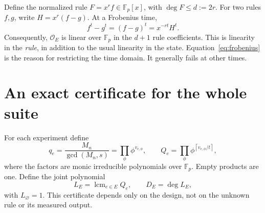 \documentclass{ijuc}
\newcommand{\Fp}{\mathbb F_p}
\newcommand{\Obs}{\mathcal O}
\newcommand{\lcmop}{\operatorname{lcm}}
\newcommand{\ceil}[1]{\left\lceil #1\right\rceil}
\begin{document}
Define the normalized rule $F=x^rf\in\Fp[x]$, with $\deg F\leq d:=2r$. For two rules $f,g$, write $H=x^r(f-g)$. At a Frobenius time,
\begin{equation}
 f^t-g^t=(f-g)^t=x^{-rt}H^t.
 \label{eq:frobenius}
\end{equation}
Consequently, $\Obs_E$ is linear over $\Fp$ in the $d+1$ rule coefficients. This is linearity in the \emph{rule}, in addition to the usual linearity in the state. Equation~\eqref{eq:frobenius} is the reason for restricting the time domain. It generally fails at other times.

\section{An exact certificate for the whole suite}
For each experiment define
\begin{equation}
 q_e=\frac{M_n}{\gcd(M_n,s)}=\prod_{\phi}\phi^{v_{e,\phi}},
 \qquad
 Q_e=\prod_{\phi}\phi^{\ceil{v_{e,\phi}/t}},
 \label{eq:Q}
\end{equation}
where the factors are monic irreducible polynomials over $\Fp$. Empty products are one. Define the joint polynomial
\begin{equation}
 L_E=\lcmop_{e\in E}Q_e,\qquad D_E=\deg L_E,
 \label{eq:L}
\end{equation}
with $L_\varnothing=1$. This certificate depends only on the design, not on the unknown rule or its measured output.
\end{document}
